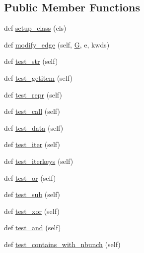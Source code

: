 \subsection*{Public Member Functions}
\begin{DoxyCompactItemize}
\item 
def \hyperlink{classnetworkx_1_1classes_1_1tests_1_1test__reportviews_1_1TestMultiEdgeView_ae718f89335521d5d5237d2182f4c1a12}{setup\+\_\+class} (cls)
\item 
def \hyperlink{classnetworkx_1_1classes_1_1tests_1_1test__reportviews_1_1TestMultiEdgeView_a2da916a49390b6475aedc38c2a78cf52}{modify\+\_\+edge} (self, \hyperlink{classnetworkx_1_1classes_1_1tests_1_1test__reportviews_1_1TestMultiEdgeView_a8641aa0e635f0bb74a0d92bdcb2285a9}{G}, e, kwds)
\item 
def \hyperlink{classnetworkx_1_1classes_1_1tests_1_1test__reportviews_1_1TestMultiEdgeView_a85413c060321ce027a6b9cf8ea57f2e6}{test\+\_\+str} (self)
\item 
def \hyperlink{classnetworkx_1_1classes_1_1tests_1_1test__reportviews_1_1TestMultiEdgeView_ae1a345dfb3142343919d9dc8070a0802}{test\+\_\+getitem} (self)
\item 
def \hyperlink{classnetworkx_1_1classes_1_1tests_1_1test__reportviews_1_1TestMultiEdgeView_afb266e1e7ca97207c5f2b4a7e815cb0e}{test\+\_\+repr} (self)
\item 
def \hyperlink{classnetworkx_1_1classes_1_1tests_1_1test__reportviews_1_1TestMultiEdgeView_aa9968b3968ebdc3ccaf5790bf381252c}{test\+\_\+call} (self)
\item 
def \hyperlink{classnetworkx_1_1classes_1_1tests_1_1test__reportviews_1_1TestMultiEdgeView_a0c3ae7d8db2a63fcefcbfa4d83368415}{test\+\_\+data} (self)
\item 
def \hyperlink{classnetworkx_1_1classes_1_1tests_1_1test__reportviews_1_1TestMultiEdgeView_af7b5c12b055d19d6170b15bb3b82f688}{test\+\_\+iter} (self)
\item 
def \hyperlink{classnetworkx_1_1classes_1_1tests_1_1test__reportviews_1_1TestMultiEdgeView_a19d6f327af9cc95f8fbd3de844187fb3}{test\+\_\+iterkeys} (self)
\item 
def \hyperlink{classnetworkx_1_1classes_1_1tests_1_1test__reportviews_1_1TestMultiEdgeView_ab0fc54b8ffa91dc6e6be00ff31c737ec}{test\+\_\+or} (self)
\item 
def \hyperlink{classnetworkx_1_1classes_1_1tests_1_1test__reportviews_1_1TestMultiEdgeView_a6d673d4e6d4cda5970d43ce9db106e3c}{test\+\_\+sub} (self)
\item 
def \hyperlink{classnetworkx_1_1classes_1_1tests_1_1test__reportviews_1_1TestMultiEdgeView_adf77e36c07f08bc298cd9b2e7795e0c8}{test\+\_\+xor} (self)
\item 
def \hyperlink{classnetworkx_1_1classes_1_1tests_1_1test__reportviews_1_1TestMultiEdgeView_a818eea38496dd0b99dfefe6089b622cf}{test\+\_\+and} (self)
\item 
def \hyperlink{classnetworkx_1_1classes_1_1tests_1_1test__reportviews_1_1TestMultiEdgeView_ac0a705c6131d4fb34d24c570057de6a8}{test\+\_\+contains\+\_\+with\+\_\+nbunch} (self)
\end{DoxyCompactItemize}
